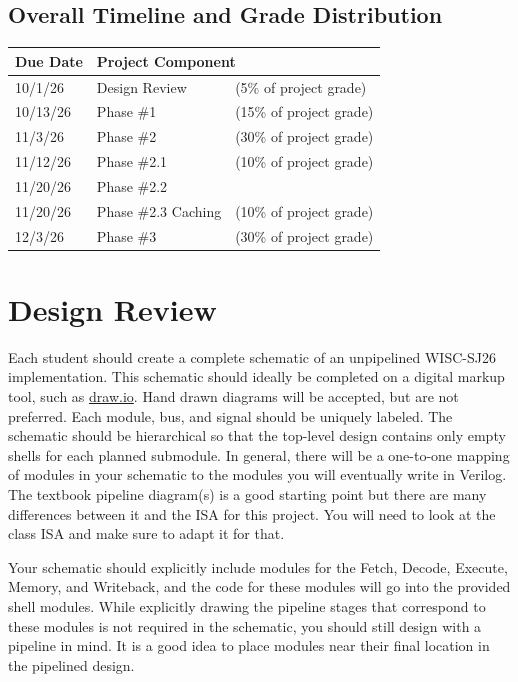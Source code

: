 \documentclass[12pt]{article}
\begin{document}
\subsection*{Overall Timeline and Grade Distribution}
\begin{center}
\begin{tabular}{|l|l|l|}
\hline
\textbf{Due Date} & \multicolumn{2}{l|}{\textbf{Project Component}} \\
\hline
10/1/26 & Design Review & (5\% of project grade) \\
\hline
10/13/26 & Phase \#1 & (15\% of project grade) \\
\hline
11/3/26 & Phase \#2 & (30\% of project grade) \\
\hline
11/12/26 & Phase \#2.1 & (10\% of project grade) \\
\hline
11/20/26 & Phase \#2.2 &  \\
\hline
 11/20/26 & Phase \#2.3 Caching & (10\% of project grade) \\
\hline
12/3/26 & Phase \#3 & (30\% of project grade) \\
\hline
\end{tabular}
\end{center}

\section*{Design Review}
Each student should create a complete schematic of an unpipelined WISC-SJ26 implementation. This schematic should ideally be completed on a digital markup tool, such as \href{https://app.diagrams.net/}{draw.io}. Hand drawn diagrams will be accepted, but are not preferred. Each module, bus, and signal should be uniquely labeled. The schematic should be hierarchical so that the top-level design contains only empty shells for each planned submodule. In general, there will be a one-to-one mapping of modules in your schematic to the modules you will eventually write in Verilog. The textbook pipeline diagram(s) is a good starting point but there are many differences between it and the ISA for this project. You will need to look at the class ISA and make sure to adapt it for that.

Your schematic should explicitly include modules for the Fetch, Decode, Execute, Memory, and Writeback, and the code for these modules will go into the provided shell modules. While explicitly drawing the pipeline stages that correspond to these modules is not required in the schematic, you should still design with a pipeline in mind. It is a good idea to place modules near their final location in the pipelined design.
\end{document}
